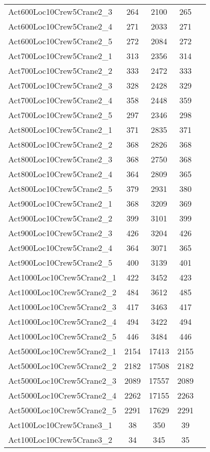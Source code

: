 {\begin{center}
\begin{longtable}{ | l | c | c | c | c | }
Act600Loc10Crew5Crane2\_3	&	264	&	2100	&	265	\\
Act600Loc10Crew5Crane2\_4	&	271	&	2033	&	271	\\
Act600Loc10Crew5Crane2\_5	&	272	&	2084	&	272	\\
Act700Loc10Crew5Crane2\_1	&	313	&	2356	&	314	\\
Act700Loc10Crew5Crane2\_2	&	333	&	2472	&	333	\\
Act700Loc10Crew5Crane2\_3	&	328	&	2428	&	329	\\
Act700Loc10Crew5Crane2\_4	&	358	&	2448	&	359	\\
Act700Loc10Crew5Crane2\_5	&	297	&	2346	&	298	\\
Act800Loc10Crew5Crane2\_1	&	371	&	2835	&	371	\\
Act800Loc10Crew5Crane2\_2	&	368	&	2826	&	368	\\
Act800Loc10Crew5Crane2\_3	&	368	&	2750	&	368	\\
Act800Loc10Crew5Crane2\_4	&	364	&	2809	&	365	\\
Act800Loc10Crew5Crane2\_5	&	379	&	2931	&	380	\\
Act900Loc10Crew5Crane2\_1	&	368	&	3209	&	369	\\
Act900Loc10Crew5Crane2\_2	&	399	&	3101	&	399	\\
Act900Loc10Crew5Crane2\_3	&	426	&	3204	&	426	\\
Act900Loc10Crew5Crane2\_4	&	364	&	3071	&	365	\\
Act900Loc10Crew5Crane2\_5	&	400	&	3139	&	401	\\
Act1000Loc10Crew5Crane2\_1	&	422	&	3452	&	423	\\
Act1000Loc10Crew5Crane2\_2	&	484	&	3612	&	485	\\
Act1000Loc10Crew5Crane2\_3	&	417	&	3463	&	417	\\
Act1000Loc10Crew5Crane2\_4	&	494	&	3422	&	494	\\
Act1000Loc10Crew5Crane2\_5	&	446	&	3484	&	446	\\
Act5000Loc10Crew5Crane2\_1	&	2154	&	17413	&	2155	\\
Act5000Loc10Crew5Crane2\_2	&	2182	&	17508	&	2182	\\
Act5000Loc10Crew5Crane2\_3	&	2089	&	17557	&	2089	\\
Act5000Loc10Crew5Crane2\_4	&	2262	&	17155	&	2263	\\
Act5000Loc10Crew5Crane2\_5	&	2291	&	17629	&	2291	\\ \hline
Act100Loc10Crew5Crane3\_1	&	38	&	350	&	39	\\
Act100Loc10Crew5Crane3\_2	&	34	&	345	&	35	\\

\end{longtable}
\end{center}}
